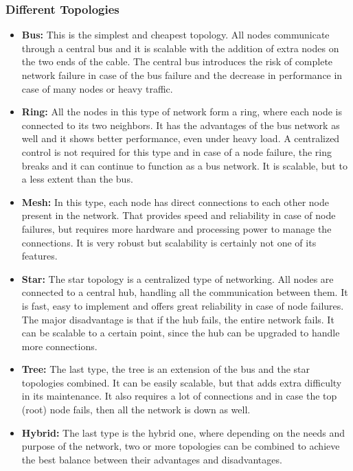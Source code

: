 \subsubsection{Different Topologies}
\begin{itemize}
\item \textbf{Bus:} This is the simplest and cheapest topology.
All nodes communicate through a central bus and it is scalable with the addition of extra nodes on the two ends of the cable.
The central bus introduces the risk of complete network failure in case of the bus failure and the decrease in performance in case of many nodes or heavy traffic.
\item \textbf{Ring:} All the nodes in this type of network form a ring, where each node is connected to its two neighbors.
It has the advantages of the bus network as well and it shows better performance, even under heavy load.
A centralized control is not required for this type and in case of a node failure, the ring breaks and it can continue to function as a bus network.
It is scalable, but to a less extent than the bus.
\item \textbf{Mesh:} In this type, each node has direct connections to each other node present in the network.
That provides speed and reliability in case of node failures, but requires more hardware and processing power to manage the connections.
It is very robust but scalability is certainly not one of its features.
\item \textbf{Star:} The star topology is a centralized type of networking.
All nodes are connected to a central hub, handling all the communication between them.
It is fast, easy to implement and offers great reliability in case of node failures.
The major disadvantage is that if the hub fails, the entire network fails.
It can be scalable to a certain point, since the hub can be upgraded to handle more connections.
\item \textbf{Tree:} The last type, the tree is an extension of the bus and the star topologies combined.
It can be easily scalable, but that adds extra difficulty in its maintenance.
It also requires a lot of connections and in case the top (root) node fails, then all the network is down as well.
\item \textbf{Hybrid:} The last type is the hybrid one, where depending on the needs and purpose of the network, two or more topologies can be combined to achieve the best balance between their advantages and disadvantages.
\end{itemize}

